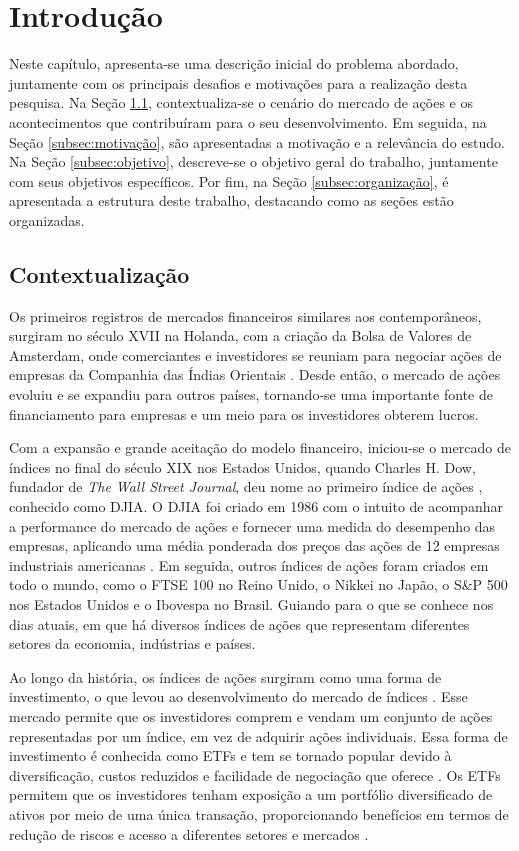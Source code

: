 \chapter{Introdução}

Neste capítulo, apresenta-se uma descrição inicial do problema abordado, juntamente com os principais desafios e motivações para a realização desta pesquisa. Na Seção \ref{subsec:contextualização}, contextualiza-se o cenário do mercado de ações e os acontecimentos que contribuíram para o seu desenvolvimento. Em seguida, na Seção \ref{subsec:motivação}, são apresentadas a motivação e a relevância do estudo. Na Seção \ref{subsec:objetivo}, descreve-se o objetivo geral do trabalho, juntamente com seus objetivos específicos. Por fim, na Seção \ref{subsec:organização}, é apresentada a estrutura deste trabalho, destacando como as seções estão organizadas.


\section{Contextualização}
\label{subsec:contextualização}
Os primeiros registros de mercados financeiros similares aos contemporâneos, surgiram no século XVII na Holanda, com a criação da Bolsa de Valores de Amsterdam, onde comerciantes e investidores se reuniam para negociar ações de empresas da Companhia das Índias Orientais \cite{french2006dutch}. Desde então, o mercado de ações evoluiu e se expandiu para outros países, tornando-se uma importante fonte de financiamento para empresas e um meio para os investidores obterem lucros.

Com a expansão e grande aceitação do modelo financeiro, iniciou-se o mercado de índices no final do século XIX nos Estados Unidos, quando Charles H. Dow, fundador de \textit{The Wall Street Journal}, deu nome ao primeiro índice de ações \cite{Richard1986}, conhecido como \ac{DJIA}. O \ac{DJIA} foi criado em 1986 com o intuito de acompanhar a performance do mercado de ações e fornecer uma medida do desempenho das empresas, aplicando uma média ponderada dos preços das ações de 12 empresas industriais americanas \cite{John_Dow}. 
Em seguida, outros índices de ações foram criados em todo o mundo, como o FTSE 100 no Reino Unido, o Nikkei no Japão, o S\&P 500 nos Estados Unidos e o Ibovespa no Brasil. Guiando para o que se conhece nos dias atuais, em que há diversos índices de ações que representam diferentes setores da economia, indústrias e países.

Ao longo da história, os índices de ações surgiram como uma forma de investimento, o que levou ao desenvolvimento do mercado de índices \cite{John2000}. Esse mercado permite que os investidores comprem e vendam um conjunto de ações representadas por um índice, em vez de adquirir ações individuais. Essa forma de investimento é conhecida como \ac{ETFs} e tem se tornado popular devido à diversificação, custos reduzidos e facilidade de negociação que oferece \cite{ben2017exchange}. Os \ac{ETFs} permitem que os investidores tenham exposição a um portfólio diversificado de ativos por meio de uma única transação, proporcionando benefícios em termos de redução de riscos e acesso a diferentes setores e mercados \cite{gad2019diversification}.

